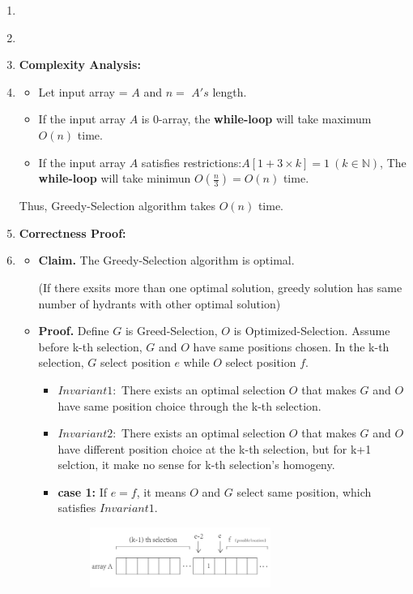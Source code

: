 \documentclass[12pt,a4paper]{article}
\makeatletter
\newtheorem*{solution}{Solution}
\theoremstyle{definition}
\renewenvironment{solution}[1][Solution] {\par\pushQED{\qed}\normalfont\topsep6\p@\@plus6\p@\relax\trivlist\item[\hskip\labelsep\bfseries#1\@addpunct{.}]\ignorespaces}{\popQED\endtrivlist\@endpefalse} \makeatother
\makeatother
\begin{document}
\begin{enumerate}
\begin{solution}
\begin{minipage}[t]{0.9\textwidth}
\begin{algorithm}[H]
        \end{algorithm}
        \end{minipage}
        \hfill
    \item\item\textbf{Complexity Analysis:}
    \item
    \begin{itemize}
    	\item [] Let input array = $A$ and $n=$ $A's$ length.
    	\item If the input array $A$ is 0-array, the \textbf{while-loop} will take maximum $O(n)$ time. 
    	\item If the input array $A$ satisfies restrictions:$A[1+3 \times k]=1\ (k \in \mathbb{N})$, The \textbf{while-loop} will take minimun $O(\frac{n}{3})=O(n)$ time.
    \end{itemize}
    Thus, Greedy-Selection algorithm takes $O(n)$ time.\item
    \textbf{Correctness Proof:}\item
    \begin{itemize}
    	\item [] \textbf{Claim.} The Greedy-Selection algorithm is optimal.\par (If there exsits more than one optimal solution, greedy solution has same number of hydrants with other optimal solution)
    	\item [] \textbf{Proof.} 
    	Define $G$ is Greed-Selection, $O$ is Optimized-Selection. Assume before k-th selection, $G$ and $O$ have same positions chosen. In the k-th selection, $G$ select position $e$ while $O$ select position $f$.
    	\begin{itemize}
    		\item [] $Invariant 1:$ There exists an optimal selection $O$ that makes $G$ and $O$ have same position choice through the k-th selection.
    		\item [] $Invariant 2:$ There exists an optimal selection $O$ that makes $G$ and $O$ have different position choice at the k-th selection, but for k+1 selction, it make no sense for k-th selection's homogeny.
    		\item  \textbf{case 1:} If $e=f$, it means $O$ and $G$ select same position, which satisfies $Invariant 1$.
    		\begin{figure}[htbp]
                \centering
                \includegraphics[width=0.63\textwidth]{figures/1_1.pdf}

\end{figure}
\end{itemize}
\end{itemize}
\end{solution}
\end{enumerate}
\end{document}
